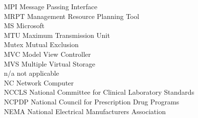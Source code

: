 \begin{tabbing}
    \>MPI \>\>Message Passing Interface\\





    \>MRPT \>\>Management Resource Planning Tool\\

    \>MS \>\>Microsoft\\



    \>MTU \>\>Maximum Transmission Unit\\


    \>Mutex \>\>Mutual Exclusion\\

    \>MVC \>\>Model View Controller\\

    \>MVS \>\>Multiple Virtual Storage\\

    \>n/a \>\>not applicable\\




    \>NC \>\>Network Computer\\

    \>NCCLS \>\>National Committee for Clinical Laboratory Standards\\

    \>NCPDP \>\>National Council for Prescription Drug Programs\\

    \>NEMA \>\>National Electrical Manufacturers Association\\


\end{tabbing}
